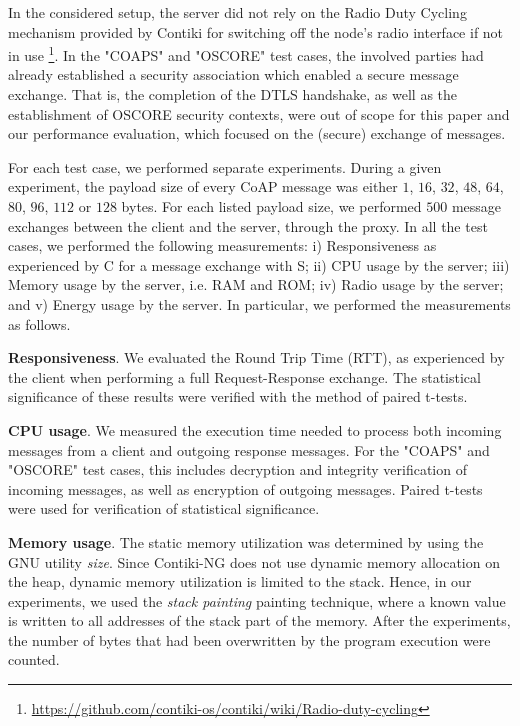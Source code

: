 {In the considered setup, the server did not rely on the Radio Duty Cycling mechanism provided by Contiki for switching off the node's radio interface if not in use \footnote{\url{https://github.com/contiki-os/contiki/wiki/Radio-duty-cycling}}. In the "COAPS" and "OSCORE" test cases, the involved parties had already established a security association which enabled a secure message exchange. That is, the completion of the DTLS handshake, as well as the establishment of OSCORE security contexts, were out of scope for this paper and our performance evaluation, which focused on the (secure) exchange of messages.

For each test case, we performed separate experiments. During a given experiment, the payload size of every CoAP message was either $1$, $16$, $32$, $48$, $64$, $80$, $96$, $112$ or $128$ bytes. For each listed payload size, we performed $500$ message exchanges between the client and the server, through the proxy. In all the test cases, we performed the following measurements: i) Responsiveness as experienced by C for a message exchange with S; ii) CPU usage by the server; iii) Memory usage by the server, i.e. RAM and ROM; iv) Radio usage by the server; and v) Energy usage by the server. In particular, we performed the measurements as follows.

\noindent
\textbf{Responsiveness}. We evaluated the Round Trip Time (RTT), as experienced by the client when performing a full Request-Response exchange. The statistical significance of these results were verified with the method of paired t-tests.

\noindent
\textbf{CPU usage}. We measured the execution time needed to process both incoming messages from a client and  outgoing response messages. For the "COAPS" and "OSCORE" test cases, this includes decryption and integrity verification of incoming messages, as well as encryption of outgoing messages. Paired t-tests were used for verification of statistical significance.

\noindent
\textbf{Memory usage}. The static memory utilization was determined by using the GNU utility \emph{size}. Since Contiki-NG does not use dynamic memory allocation on the heap, dynamic memory utilization is limited to the stack. Hence, in our experiments, we used the \textit{stack painting} painting technique, where a known value is written to all addresses of the stack part of the memory. After the experiments, the number of bytes that had been overwritten by the program execution were counted.

}
